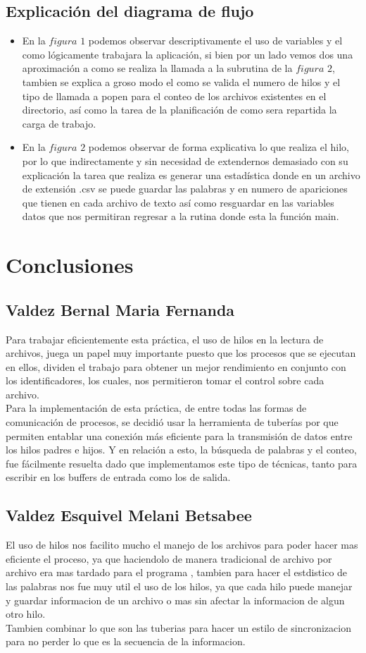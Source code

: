 \documentclass[11pt,a4paper]{article}
\begin{document}
\subsection{Explicación del diagrama de flujo}
\begin{itemize}
  \item En la $figura$ $1$ podemos observar descriptivamente el uso de variables y el como lógicamente trabajara la aplicación, si bien por un lado vemos dos una aproximación a como se realiza la llamada a la subrutina de la $figura$ $2$, tambien se explica a groso modo el como se valida el numero de hilos y el tipo de llamada a popen para el conteo de los archivos existentes en el directorio, así como la tarea de la planificación de como sera repartida la carga de trabajo.
  \item En la $figura$ $2$ podemos observar de forma explicativa lo que realiza el hilo, por lo que indirectamente y sin necesidad de extendernos demasiado con su explicación la tarea que realiza es generar una estadística donde en un archivo de extensión .csv se puede guardar las palabras y en numero de apariciones que tienen en cada archivo de texto así como resguardar en las variables datos que nos permitiran regresar a la rutina donde esta la función main.
\end{itemize}

\section{Conclusiones}
\subsection{Valdez Bernal Maria Fernanda}
Para trabajar eficientemente esta práctica, el uso de hilos en la lectura de archivos, juega un papel muy importante puesto que los procesos que se ejecutan en ellos, dividen el trabajo para obtener un mejor rendimiento en conjunto con los identificadores, los cuales, nos permitieron tomar el control sobre cada archivo.\\
Para la implementación de esta práctica, de entre todas las formas de comunicación de procesos, se decidió usar la herramienta de tuberías por que permiten entablar una conexión más eficiente para la transmisión de datos entre los hilos padres e hijos. Y en relación a esto, la búsqueda de palabras y el conteo, fue fácilmente resuelta dado que implementamos este tipo de técnicas, tanto para escribir en los buffers de entrada como los de salida.
\subsection{Valdez Esquivel Melani Betsabee}
El uso de hilos nos facilito mucho el manejo de los archivos para poder hacer mas eficiente el proceso, ya que haciendolo de manera tradicional de archivo por archivo era mas tardado para el programa
, tambien para hacer el estdistico de las palabras nos fue muy util el uso de los hilos, ya que cada hilo puede manejar y guardar informacion de un archivo o mas sin afectar la informacion de
algun otro hilo.\\
Tambien combinar lo que son las tuberias para hacer un estilo de sincronizacion para no perder lo que es la secuencia de la informacion.
\end{document}
